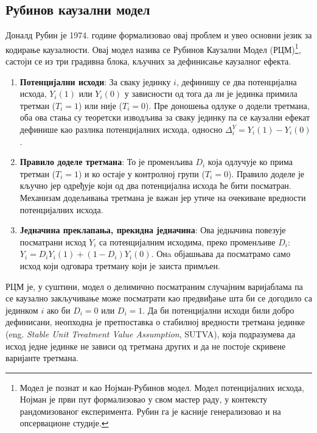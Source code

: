 \documentclass[12pt, a4paper]{article}
\begin{document}
\subsection{Рубинов каузални модел}
    
Доналд Рубин је 1974. године формализовао овај проблем и увео основни језик за кодирање каузалности. Овај модел назива се Рубинов Каузални Модел (РЦМ)\footnote{Модел је познат и као Нојман-Рубинов модел. Модел потенцијалних исхода, Нојман је први пут формализовао у свом мастер раду, у контексту рандомизованог експеримента. Рубин га је касније генерализовао и на опсервационе студије.}, састоји се 
из три градивна блока, кључних за дефинисање каузалног ефекта.
\begin{enumerate}
    \item \textbf{Потенцијални исходи}: За сваку јединку $i$, дефинишу се два потенцијална исхода, $Y_i(1)$ или $Y_i(0)$ у зависности од тога да ли 
    је јединка примила третман ($T_i=1$) или није ($T_i=0$). Пре доношења одлуке о додели третмана, оба ова стања су теоретски изводљива за сваку јединку па се каузални 
    ефекат дефинише као разлика потенцијалних исхода, односно $\Delta^Y_i = Y_i(1) - Y_i(0)$.
    \item \textbf{Правило доделе третмана}: То је променљива $D_i$ која одлучује ко прима третман ($T_i=1$) и ко остаје у контролној групи ($T_i=0$). Правило 
    доделе је кључно јер одређује који од два потенцијална исхода ће бити посматран. Механизам додељивања третмана је важан јер утиче на очекиване вредности потенцијалних исхода.
    \item \textbf{Једначина преклапања, прекидна једначина}: Ова једначина повезује посматрани исход $Y_i$ са потенцијалним исходима, преко променљиве $D_i$: $Y_i = D_i Y_i(1) + (1 - D_i) Y_i(0)$. Онa објашњава да посматрамо само исход који одговара третману који је заиста примљен.
\end{enumerate}

РЦМ је, у суштини, модел о делимично посматраним случајним варијаблама па се каузално закључивање може посматрати као предвиђање шта би се догодило са јединком $i$ 
ако би $D_i=0$ или $D_i=1$. Да би потенцијални исходи били добро дефинисани, неопходна је претпоставка о стабилној вредности третмана јединке (eng. \textit{Stable Unit Treatment Value Assumption}, SUTVA), 
која подразумева да исход једне јединке не зависи од третмана других и да не постоје скривене варијанте третмана. 
\end{document}
